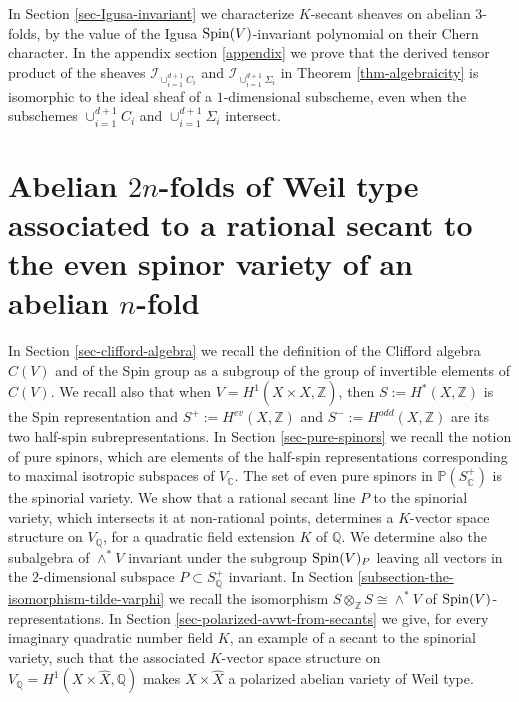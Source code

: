 \documentclass[12pt]{amsart}
\numberwithin{equation}{subsection}
\theoremstyle{plain}
\theoremstyle{definition}
\newcommand{\CC}{{\mathbb C}}
\newcommand{\QQ}{{\mathbb Q}}
\newcommand{\ZZ}{{\mathbb Z}}
\newcommand{\PP}{{\mathbb P}}
\newcommand{\Spin}{{\rm Spin}}
\newcommand{\Ideal}[1]{{\mathcal I}_{#1}}
\begin{document}
In Section \ref{sec-Igusa-invariant} we characterize $K$-secant sheaves on abelian $3$-folds, by the value of the Igusa $\Spin(V)$-invariant polynomial on their Chern character.
In the appendix section \ref{appendix} we prove that the derived tensor product of the sheaves $\Ideal{\cup_{i=1}^{d+1}C_i}$ and $\Ideal{\cup_{i=1}^{d+1}\Sigma_i}$
in Theorem \ref{thm-algebraicity} is isomorphic to the ideal sheaf of a $1$-dimensional subscheme, even when the subschemes $\cup_{i=1}^{d+1}C_i$ and $\cup_{i=1}^{d+1}\Sigma_i$ intersect.

% 
\section{Abelian $2n$-folds of Weil type associated to a rational secant to the even spinor variety of an abelian $n$-fold}
\label{section-abelian-2n-folds-of-Weil-type-from-rational-secants}

In Section \ref{sec-clifford-algebra} we recall the definition of the Clifford algebra $C(V)$ and of the Spin group as a subgroup of the group of invertible elements of $C(V)$. We recall also that when $V=H^1(X\times\hat{X},\ZZ)$, then $S:=H^*(X,\ZZ)$ is the Spin representation and $S^+:=H^{ev}(X,\ZZ)$ and $S^-:=H^{odd}(X,\ZZ)$ are its two half-spin subrepresentations. In 
Section \ref{sec-pure-spinors} we recall the notion of pure spinors, which are elements of the half-spin representations corresponding to maximal isotropic subspaces of $V_\CC$. The set of even pure spinors in $\PP(S^+_\CC)$ is the spinorial variety. We show that a rational secant line $P$ to the spinorial variety, which intersects it at non-rational points,  determines a $K$-vector space structure on $V_\QQ$, for a quadratic field extension $K$ of $\QQ$. We determine also the subalgebra of $\wedge^*V$ invariant under the subgroup $\Spin(V)_P$ leaving all vectors in the $2$-dimensional subspace $P\subset S^+_\QQ$ invariant.
In Section \ref{subsection-the-isomorphism-tilde-varphi} we recall the isomorphism  $S\otimes_\ZZ S\cong \wedge^*V$ of $\Spin(V)$-representations.
In Section \ref{sec-polarized-avwt-from-secants} we give, for every imaginary quadratic number field $K$, an example of a secant to the spinorial variety, such that 
the associated $K$-vector space structure on $V_\QQ=H^1(X\times\hat{X},\QQ)$ makes $X\times\hat{X}$ a polarized abelian variety of Weil type.
% 
\end{document}
